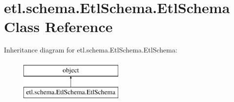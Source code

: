 \hypertarget{classetl_1_1schema_1_1EtlSchema_1_1EtlSchema}{\section{etl.\-schema.\-Etl\-Schema.\-Etl\-Schema Class Reference}
\label{classetl_1_1schema_1_1EtlSchema_1_1EtlSchema}
}
Inheritance diagram for etl.\-schema.\-Etl\-Schema.\-Etl\-Schema\-:\begin{figure}[H]
\begin{center}
\leavevmode
\includegraphics[height=2.000000cm]{classetl_1_1schema_1_1EtlSchema_1_1EtlSchema}
\end{center}
\end{figure}
